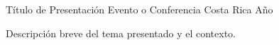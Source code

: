 
\begin{cventries}

  \cventry
    {Título de Presentación}
    {Evento o Conferencia}
    {Costa Rica}
    {Año}
    {
      \begin{cvitems}
        \item {Descripción breve del tema presentado y el contexto.}
      \end{cvitems}
    }

\end{cventries}
